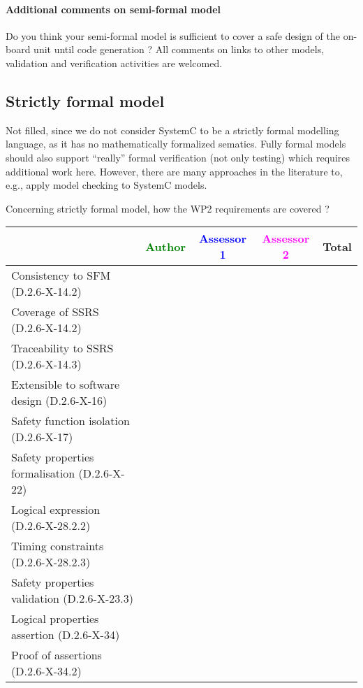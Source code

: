 \paragraph{Additional comments on semi-formal  model} Do you think your semi-formal  model is sufficient to cover a safe design of the on-board unit until code generation ?
All comments on links to  other models, validation and verification activities are welcomed.

\subsection{Strictly formal model}

\begin{author_comment}
Not filled, since we do not consider SystemC to be a strictly formal modelling language, as it has no mathematically formalized sematics. Fully formal models should also support ``really'' formal verification (not only testing) which requires additional work here. However, there are many approaches in the literature to, e.g., apply model checking to SystemC models.
\end{author_comment}

Concerning strictly formal model, how the WP2 requirements are covered ?

\begin{tabular}{|l | c | c | c | c|}
\hline
& \textcolor{green}{Author} & \textcolor{blue}{Assessor 1} & \textcolor{magenta}{Assessor 2} & Total \\
\hline 
Consistency to SFM (D.2.6-X-14.2) & & & &  \\
\hline
Coverage of SSRS (D.2.6-X-14.2)  & & & &  \\
\hline
Traceability to  SSRS (D.2.6-X-14.3)  & & & &  \\
\hline
Extensible to software design (D.2.6-X-16)  & & & &  \\
\hline
Safety function isolation (D.2.6-X-17)  & & & &  \\
\hline 
Safety properties formalisation (D.2.6-X-22)  & & & &  \\
\hline
Logical expression (D.2.6-X-28.2.2)  & & & &  \\
\hline
Timing constraints (D.2.6-X-28.2.3)  & & & &  \\
\hline
Safety properties validation (D.2.6-X-23.3)  & & & &  \\
\hline
Logical properties assertion (D.2.6-X-34)  & & & &  \\
\hline
Proof of assertions (D.2.6-X-34.2)  & & & &  \\
\hline
\end{tabular}

